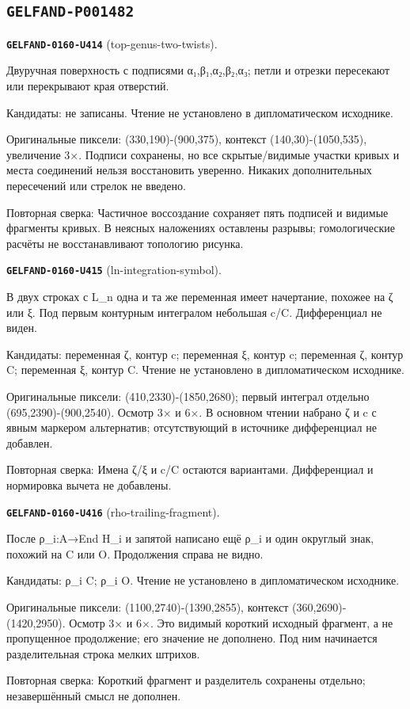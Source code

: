 \subsection*{\texttt{GELFAND-P001482}}
\par\noindent\leavevmode{}\label{GELFAND-0160-U414}\label{GELFAND-P001482:top-genus-two-twists}\textbf{\texttt{GELFAND-0160-U414}} (top-genus-two-twists).\nopagebreak[4]\par
Двуручная поверхность с подписями α₁,β₁,α₂,β₂,α₃; петли и отрезки пересекают или перекрывают края отверстий.\par
Кандидаты: не записаны. Чтение не установлено в дипломатическом исходнике.\par
Оригинальные пиксели: (330,190)-(900,375), контекст (140,30)-(1050,535), увеличение 3×. Подписи сохранены, но все скрытые/видимые участки кривых и места соединений нельзя восстановить уверенно. Никаких дополнительных пересечений или стрелок не введено.\par
Повторная сверка: Частичное воссоздание сохраняет пять подписей и видимые фрагменты кривых. В неясных наложениях оставлены разрывы; гомологические расчёты не восстанавливают топологию рисунка.\par\medskip
\par\noindent\leavevmode{}\label{GELFAND-0160-U415}\label{GELFAND-P001482:ln-integration-symbol}\textbf{\texttt{GELFAND-0160-U415}} (ln-integration-symbol).\nopagebreak[4]\par
В двух строках с L\_n одна и та же переменная имеет начертание, похожее на ζ или ξ. Под первым контурным интегралом небольшая c/C. Дифференциал не виден.\par
Кандидаты: переменная ζ, контур c; переменная ξ, контур c; переменная ζ, контур C; переменная ξ, контур C. Чтение не установлено в дипломатическом исходнике.\par
Оригинальные пиксели: (410,2330)-(1850,2680); первый интеграл отдельно (695,2390)-(900,2540). Осмотр 3× и 6×. В основном чтении набрано ζ и c с явным маркером альтернатив; отсутствующий в источнике дифференциал не добавлен.\par
Повторная сверка: Имена ζ/ξ и c/C остаются вариантами. Дифференциал и нормировка вычета не добавлены.\par\medskip
\par\noindent\leavevmode{}\label{GELFAND-0160-U416}\label{GELFAND-P001482:rho-trailing-fragment}\textbf{\texttt{GELFAND-0160-U416}} (rho-trailing-fragment).\nopagebreak[4]\par
После ρ\_i:A→End H\_i и запятой написано ещё ρ\_i и один округлый знак, похожий на C или O. Продолжения справа не видно.\par
Кандидаты: ρ\_i C; ρ\_i O. Чтение не установлено в дипломатическом исходнике.\par
Оригинальные пиксели: (1100,2740)-(1390,2855), контекст (360,2690)-(1420,2950). Осмотр 3× и 6×. Это видимый короткий исходный фрагмент, а не пропущенное продолжение; его значение не дополнено. Под ним начинается разделительная строка мелких штрихов.\par
Повторная сверка: Короткий фрагмент и разделитель сохранены отдельно; незавершённый смысл не дополнен.\par\medskip
